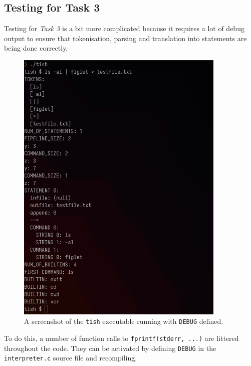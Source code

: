 \documentclass[12pt]{article}
\begin{document}
\subsection{Testing for Task 3}\label{testing-task3}

Testing for \textit{Task 3} is a bit more complicated because it
requires a lot of debug output to ensure that tokenisation,
parsing and translation into statements are being done
correctly.



% 

\begin{figure}[H]
\centering
\includegraphics[width=10cm]{task3and4-test}
\caption{A screenshot of the \texttt{tish} executable running
with \texttt{DEBUG} defined.}
\end{figure}

To do this, a number of function calls to
\texttt{fprintf(stderr, ...)} are littered throughout the code.
They can be activated by defining \texttt{DEBUG} in the
\texttt{interpreter.c} source file and recompiling.
\end{document}
